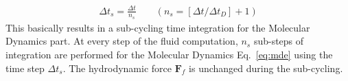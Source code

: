 \begin{align}
\Delta t_{s}=\frac{\Delta t}{\textit{n}_{s}} \qquad(\textit{n}_{s}=[\Delta t/ \Delta t_{D}]+1)
\end{align} 
This basically results in a sub-cycling time integration for the Molecular Dynamics part. At every step of the fluid computation, $\textit{n}_{s}$ sub-steps of integration are performed for the Molecular Dynamics Eq.~\ref{eq:mde} using the time step $\Delta t_{s}$. The hydrodynamic force $\mathbf{F}_{f}$ is unchanged during the sub-cycling. 
%
%
